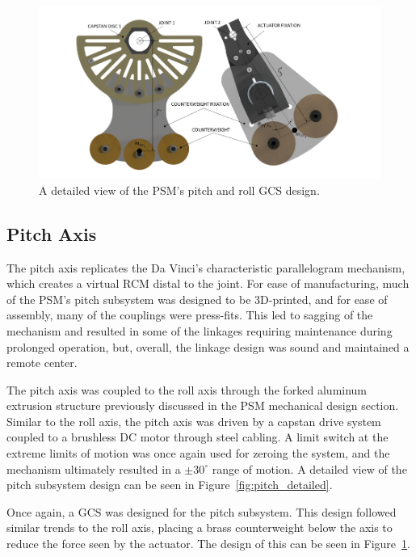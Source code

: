 \begin{figure}[htb!] %
    \centering
    \includegraphics[width=1.00\linewidth]{figures/PSM_GCS.png}
    \caption{A detailed view of the PSM's pitch and roll GCS design.\cite{walder2022design}}
    \label{fig:PSM_GCS}
\end{figure}


\subsection{Pitch Axis}
The pitch axis replicates the Da Vinci's characteristic parallelogram mechanism, which creates a virtual RCM distal to the joint. For ease of manufacturing, much of the PSM's pitch subsystem was designed to be 3D-printed, and for ease of assembly, many of the couplings were press-fits. This led to sagging of the mechanism and resulted in some of the linkages requiring maintenance during prolonged operation, but, overall, the linkage design was sound and maintained a remote center.

The pitch axis was coupled to the roll axis through the forked aluminum extrusion structure previously discussed in the PSM mechanical design section. Similar to the roll axis, the pitch axis was driven by a capstan drive system coupled to a brushless DC motor through steel cabling. A limit switch at the extreme limits of motion was once again used for zeroing the system, and the mechanism ultimately resulted in a $\pm 30^\circ$ range of motion. A detailed view of the pitch subsystem design can be seen in Figure~\ref{fig:pitch_detailed}.

Once again, a GCS was designed for the pitch subsystem. This design followed similar trends to the roll axis, placing a brass counterweight below the axis to reduce the force seen by the actuator. The design of this can be seen in Figure~\ref{fig:PSM_GCS}. 



